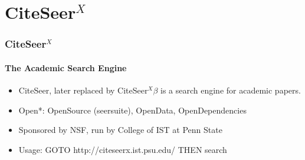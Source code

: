 \section{CiteSeer${}^{X}$}

\begin{frame}
    \frametitle{CiteSeer${}^{X}$}
    \framesubtitle{The Academic Search Engine}
    \begin{itemize}
        \item CiteSeer, later replaced by CiteSeer${}^{X}\beta$ is a search engine for academic papers.
        \item Open*: OpenSource (seersuite), OpenData, OpenDependencies 
        \item Sponsored by NSF, run by College of IST at Penn State
        \item Usage: GOTO http://citeseerx.ist.psu.edu/ THEN search
    \end{itemize}
\end{frame}